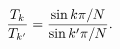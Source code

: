 \begin{equation}    
{T_k\over T_{k^\prime}}={\sin k \pi /N\over \sin k^\prime \pi /N}.    
\label{sine} \end{equation} 
